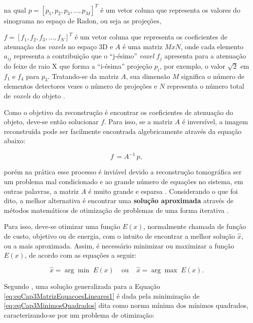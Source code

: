 \noindent na qual $p = [p_{1},p_{2},p_{3},...,p_{M}]^{T}$ é um vetor coluna que representa os valores do sinograma no espaço de Radon, ou seja as projeções, {$f = [f_{1},f_{2},f_{3},...,f_{N}]^{T}$ é um vetor coluna que representa os coeficientes de atenuação dos \textit{voxels} no espaço \acs{3D} e $A$ é uma matriz $MxN$, onde cada elemento $a_{ij}$ representa a contribuição que o ``j-ésimo'' \textit{voxel} $f_{j}$ apresenta para a atenuação do feixe de raio X que forma a ``i-ésima'' projeção $p_{i}$, por exemplo, o valor $\sqrt{2}$ em $f_{1}$ e $f_{4}$ para $p_{3}$. Tratando-se da matriz $A$, sua dimensão $M$ significa o número de elementos detectores vezes o número de projeções e $N$ representa o número total de \textit{voxels} do objeto \cite{zeng2010medical,levakhina2014three}.

Como o objetivo da reconstrução é encontrar os coeficientes de atenuação do objeto, deve-se então solucionar $f$. Para isso, se a matriz $A$ é inversível, a imagem reconstruída pode ser facilmente encontrada algebricamente através da equação abaixo:

 \begin{equation}
 f \, = A^{-1} \, p,
 \label{eq:eqCap3MatrizEquacoesLineares2}
 \end{equation}      

\noindent porém na prática esse processo é inviável devido a reconstrução tomográfica ser um problema mal condicionado e ao grande número de equações no sistema, em outras palavras, a matriz $A$ é muito grande e esparsa \cite{levakhina2014three}. Considerando o que foi dito, a melhor alternativa é encontrar uma \textbf{solução aproximada} através de métodos matemáticos de otimização de problemas de uma forma iterativa \cite{buzug2008computed}.  

Para isso, deve-se otimizar uma função $E(x)$, normalmente chamada de função de custo, objetivo ou de energia, com o intuito de encontrar a melhor solução $\hat{x}$, ou a mais aproximada. Assim, é necessário minimizar ou maximizar a função $E(x)$, de acordo com as equações a seguir:
 
\begin{equation}
\hat{x} = \underset{}{\arg\min} \; E(x) \;\;\;\; \text{ou} \;\;\;\; \hat{x} = \underset{}{\arg\max} \; E(x).
\label{eq:eqCap3Minimizacao}
\end{equation} 

Segundo , uma solução generalizada para a Equação \ref{eq:eqCap3MatrizEquacoesLineares1} é dada pela minimização de \eqref{eq:eqCap3MinimosQuadrados} dita como norma mínima dos mínimos quadrados, caracterizando-se por um problema de otimização:

}
